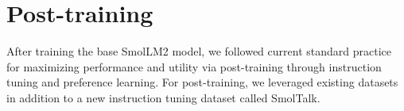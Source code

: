 \documentclass{article}
\theoremstyle{plain}
\theoremstyle{definition}
\theoremstyle{remark}
\begin{document}
\begin{table}[t]
\caption{Performance comparison of SmolLM2 and other 1-2B \textbf{base models} across benchmarks. SmolLM2 demonstrates competitive results  highlighting its generalization capabilities.}
\label{tab:base_model_evals}
\vspace{0.5em}
\vspace{-0.65cm} 
\end{table}
\vspace{-0.25cm} 

\section{Post-training}
\vspace{-0.15cm} 

\label{sec:instruction-tuning}

After training the base SmolLM2 model, we followed current standard practice for maximizing performance and utility via post-training through instruction tuning and preference learning. 
For post-training, we leveraged existing datasets in addition to a new instruction tuning dataset called SmolTalk.
\end{document}

